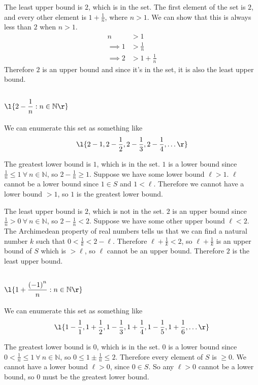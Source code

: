 \documentclass[a4paper]{article}
\begin{document}
The least upper bound is $2$, which is in the set. The first element of the set is $2$, and every other element is $1 + \frac1n$, where $n > 1$. We can show that this is always less than $2$ when $n > 1$.
\begin{align*}
    n &> 1 \\
    \implies 1 &> \frac1n \\
    \implies 2 &> 1 + \frac1n
\end{align*}
Therefore $2$ is an upper bound and since it's in the set, it is also the least upper bound.

\subsection{$\l\{ 2 - \dfrac{1}{n} : n \in \mathbb{N} \r\}$}

We can enumerate this set as something like \[ \l\{ 2 - 1, 2 - \frac12, 2 - \frac13, 2 - \frac14, \ldots \r\} \]

The greatest lower bound is $1$, which is in the set. $1$ is a lower bound since $\frac1n \le 1\ \forall\ n \in \mathbb N$, so $2 - \frac1n \ge 1$. Suppose we have some lower bound $\ell > 1$. $\ell$ cannot be a lower bound since $1 \in S$ and $1 < \ell$. Therefore we cannot have a lower bound $> 1$, so $1$ is the greatest lower bound.

The least upper bound is $2$, which is not in the set. $2$ is an upper bound since $\frac1n > 0\ \forall\ n \in \mathbb N$, so $2 - \frac1n < 2$. Suppose we have some other upper bound $\ell < 2$. The Archimedean property of real numbers tells us that we can find a natural number $k$ such that $0 < \frac1k < 2 - \ell$. Therefore $\ell + \frac1k < 2$, so $\ell + \frac1k$ is an upper bound of $S$ which is $> \ell$, so $\ell$ cannot be an upper bound. Therefore $2$ is the least upper bound.

\subsection{$\l\{ 1 + \dfrac{{(-1)}^n}{n} : n \in \mathbb{N} \r\}$}

We can enumerate this set as something like \[ \l\{ 1 - \frac11, 1 + \frac12, 1 - \frac13, 1 + \frac14, 1 - \frac15, 1 + \frac16, \ldots \r\} \]

The greatest lower bound is $0$, which is in the set. $0$ is a lower bound since $0 < \frac1n \le 1\ \forall\ n \in \mathbb N$, so $0 \le 1 \pm \frac1n \le 2$. Therefore every element of $S$ is $\ge 0$. We cannot have a lower bound $\ell > 0$, since $0 \in S$. So any $\ell > 0$ cannot be a lower bound, so $0$ must be the greatest lower bound.
\end{document}
